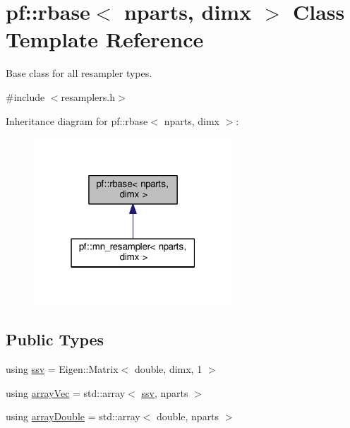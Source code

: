 \hypertarget{classpf_1_1rbase}{}\section{pf\+:\+:rbase$<$ nparts, dimx $>$ Class Template Reference}
\label{classpf_1_1rbase}


Base class for all resampler types.  




{\ttfamily \#include $<$resamplers.\+h$>$}



Inheritance diagram for pf\+:\+:rbase$<$ nparts, dimx $>$\+:\nopagebreak
\begin{figure}[H]
\begin{center}
\leavevmode
\includegraphics[width=211pt]{classpf_1_1rbase__inherit__graph}
\end{center}
\end{figure}
\subsection*{Public Types}
\begin{DoxyCompactItemize}
\item 
using \hyperlink{classpf_1_1rbase_a47a4bdc0e3c08b72ce4f24a18d5b0e04}{ssv} = Eigen\+::\+Matrix$<$ double, dimx, 1 $>$
\item 
using \hyperlink{classpf_1_1rbase_a89951bb3872c1c6a0c3da0962a9aaa13}{array\+Vec} = std\+::array$<$ \hyperlink{classpf_1_1rbase_a47a4bdc0e3c08b72ce4f24a18d5b0e04}{ssv}, nparts $>$
\item 
using \hyperlink{classpf_1_1rbase_a37b2d02d00f75d9550122b763cbb3fed}{array\+Double} = std\+::array$<$ double, nparts $>$
\end{DoxyCompactItemize}
